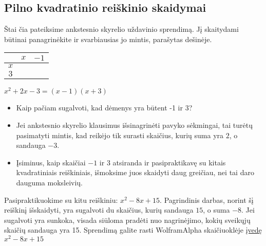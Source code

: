 \documentclass[a4paper]{article}
\newcommand{\high}[1]{\cellcolor{orange!80!white}{#1}}
\newcommand{\midd}[1]{\cellcolor{green!50!white}{#1}}
\newcommand{\low}[1]{\cellcolor{blue!50!white}{#1}}
\begin{document}
\subsection{Pilno kvadratinio reiškinio skaidymai}
Štai čia pateiksime ankstesnio skyrelio uždavinio sprendimą. Jį skaitydami būtinai panagrinėkite ir svarbiausias jo mintis, parašytas dešinėje.
\begin{framed}
\begin{minipage}[b]{0.35\linewidth}
\begin{center}
\begin{tabular}{c||c|c}
& $x$ & $-1$ \\ \hline \hline
 $x$ & \high{$x^2$} & \midd{$-x$}\\ \hline 
 $3$ &  \midd{$3x$}  & \low{$-3$}
\end{tabular}
\newline\newline\newline
$x^2+2x-3 = (x-1)(x+3)$
\end{center}
\end{minipage}
\begin{minipage}[b]{0.6\linewidth}

\begin{itemize}
\item Kaip pačiam sugalvoti, kad dėmenys yra būtent -1 ir 3? 
\item Jei ankstesnio skyrelio klausimus išsinagrinėti pavyko sėkmingai, tai turėtų pasimatyti mintis, kad reikėjo tik surasti skaičius, kurių suma yra $2$, o sandauga $-3$. 
\item Įsiminus, kaip skaičiai $-1$ ir $3$ atsiranda ir pasipraktikavę su kitais kvadratiniais reiškiniais, išmoksime juos skaidyti daug greičiau, nei tai daro dauguma moksleivių.
\end{itemize}
\end{minipage}
\end{framed}
Pasipraktikuokime su kitu reiškiniu: $x^2-8x+15$. Pagrindinis darbas, norint šį reiškinį išskaidyti, yra sugalvoti du skaičius, kurių sandauga $15$, o suma $-8$. Jei sugalvoti yra sunkoka, visada siūloma pradėti nuo nagrinėjimo, kokių sveikųjų skaičių sandauga yra 15. Sprendimą galite rasti WolframAlpha skaičiuoklėje \href{https://www.wolframalpha.com/input/?i=x\%5E2-8x\%2B15}{įvedę} $x^2 - 8x + 15$
\end{document}
